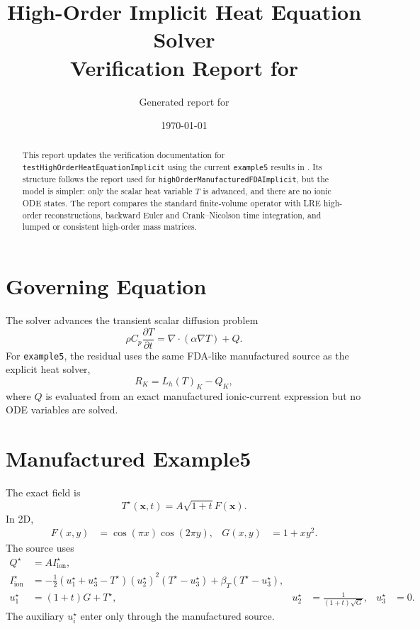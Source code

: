 \documentclass[11pt,a4paper]{article}
\title{High-Order Implicit Heat Equation Solver\\Verification Report for \code{example5}}
\author{Generated report for \code{testHighOrderHeatEquationImplicit}}
\date{\today}
\newcommand{\code}[1]{\texttt{#1}}
\begin{document}
\maketitle
\begin{abstract}
This report updates the verification documentation for \code{testHighOrderHeatEquationImplicit} using the current \code{example5} results in . Its structure follows the report used for \code{highOrderManufacturedFDAImplicit}, but the model is simpler: only the scalar heat variable $T$ is advanced, and there are no ionic ODE states. The report compares the standard finite-volume operator with LRE high-order reconstructions, backward Euler and Crank--Nicolson time integration, and lumped or consistent high-order mass matrices.
\end{abstract}
\section{Governing Equation}
The solver advances the transient scalar diffusion problem
\begin{equation}
\rho C_p\frac{\partial T}{\partial t} = \nabla\cdot(\alpha\nabla T)+Q.
\end{equation}
For \code{example5}, the residual uses the same FDA-like manufactured source as the explicit heat solver,
\begin{equation}
R_K = L_h(T)_K - Q_K,
\end{equation}
where $Q$ is evaluated from an exact manufactured ionic-current expression but no ODE variables are solved.
\section{Manufactured Example5}
The exact field is
\begin{equation}
T^\star(\mathbf{x},t)=A\sqrt{1+t}F(\mathbf{x}).
\end{equation}
In 2D,
\begin{align}
F(x,y)&=\cos(\pi x)\cos(2\pi y), & G(x,y)&=1+xy^2.
\end{align}
The source uses
\begin{align}
Q^\star &= A I_{\mathrm{ion}}^\star,\\
I_{\mathrm{ion}}^\star &= -\frac12\left(u_1^\star+u_3^\star-T^\star\right)(u_2^\star)^2\left(T^\star-u_3^\star\right)+\beta_T\left(T^\star-u_3^\star\right),\\
u_1^\star&=(1+t)G+T^\star, & u_2^\star&=\frac{1}{(1+t)\sqrt{G}}, & u_3^\star&=0.
\end{align}
The auxiliary $u_i^\star$ enter only through the manufactured source.
\end{document}
